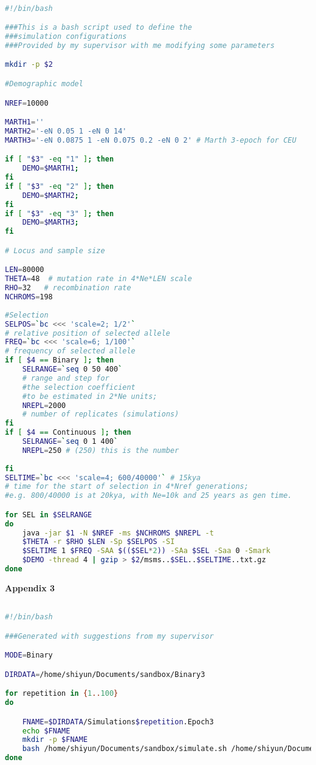\begin{lstlisting}[language=Bash,breaklines]

#!/bin/bash

###This is a bash script used to define the 
###simulation configurations
###Provided by my supervisor with me modifying some parameters

mkdir -p $2

#Demographic model

NREF=10000 

MARTH1='' 
MARTH2='-eN 0.05 1 -eN 0 14' 
MARTH3='-eN 0.0875 1 -eN 0.075 0.2 -eN 0 2' # Marth 3-epoch for CEU

if [ "$3" -eq "1" ]; then
	DEMO=$MARTH1;
fi
if [ "$3" -eq "2" ]; then
	DEMO=$MARTH2;
fi
if [ "$3" -eq "3" ]; then
	DEMO=$MARTH3;
fi

# Locus and sample size

LEN=80000 
THETA=48  # mutation rate in 4*Ne*LEN scale
RHO=32   # recombination rate
NCHROMS=198 
          
#Selection
SELPOS=`bc <<< 'scale=2; 1/2'`
# relative position of selected allele
FREQ=`bc <<< 'scale=6; 1/100'` 
# frequency of selected allele 
if [ $4 == Binary ]; then 
    SELRANGE=`seq 0 50 400` 
    # range and step for 
    #the selection coefficient 
    #to be estimated in 2*Ne units;
    NREPL=2000 
    # number of replicates (simulations) 
fi
if [ $4 == Continuous ]; then 
    SELRANGE=`seq 0 1 400` 
    NREPL=250 # (250) this is the number 
   
fi
SELTIME=`bc <<< 'scale=4; 600/40000'` # 15kya
# time for the start of selection in 4*Nref generations; 
#e.g. 800/40000 is at 20kya, with Ne=10k and 25 years as gen time.

for SEL in $SELRANGE
do
    java -jar $1 -N $NREF -ms $NCHROMS $NREPL -t 
    $THETA -r $RHO $LEN -Sp $SELPOS -SI 
    $SELTIME 1 $FREQ -SAA $(($SEL*2)) -SAa $SEL -Saa 0 -Smark 
    $DEMO -thread 4 | gzip > $2/msms..$SEL..$SELTIME..txt.gz
done
\end{lstlisting}


\cleardoublepage\clearpage
\large \vspace{1cm}
{\bf Appendix 3} 
\small 

\begin{lstlisting}[language=Bash,breaklines]

#!/bin/bash

###Generated with suggestions from my supervisor

MODE=Binary 

DIRDATA=/home/shiyun/Documents/sandbox/Binary3

for repetition in {1..100}
do

	FNAME=$DIRDATA/Simulations$repetition.Epoch3
	echo $FNAME
	mkdir -p $FNAME
	bash /home/shiyun/Documents/sandbox/simulate.sh /home/shiyun/Documents/msms3.2rc-b163.jar $FNAME 3 $MODE
done
\end{lstlisting}


